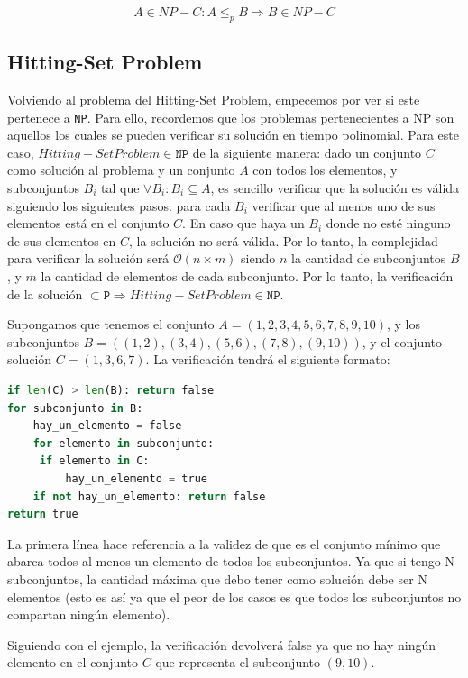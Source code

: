 \[ A \in {NP-C}: A \leq _p B \Rightarrow B \in NP-C \]

\subsection{Hitting-Set Problem}

Volviendo al problema del Hitting-Set Problem, empecemos por ver si este pertenece a \texttt{NP}. Para ello, recordemos que los problemas pertenecientes a NP son aquellos los cuales se pueden verificar su solución en tiempo polinomial. Para este caso, $Hitting-Set Problem \in \texttt{NP}$ de la siguiente manera: dado un conjunto $C$ como solución al problema y un conjunto $A$ con todos los elementos, y subconjuntos $B_i$ tal que $\forall B_i: B_i \subseteq A$, es sencillo verificar que la solución es válida siguiendo los siguientes pasos: para cada $B_i$ verificar que al menos uno de sus elementos está en el conjunto $C$. En caso que haya un $B_i$ donde no esté ninguno de sus elementos en $C$, la solución no será válida. Por lo tanto, la complejidad para verificar la solución será $\mathcal{O}(n \times m)$ siendo $n$ la cantidad de subconjuntos $B$, y $m$ la cantidad de elementos de cada subconjunto. Por lo tanto, la verificación de la solución $\subset \texttt{P} \Rightarrow Hitting-Set Problem \in \texttt{NP}$.

Supongamos que tenemos el conjunto $A = (1, 2, 3, 4, 5, 6, 7, 8, 9, 10)$, y los subconjuntos $B = ((1, 2), (3, 4), (5, 6), (7, 8), (9, 10))$, y el conjunto solución $C = (1, 3, 6, 7)$. La verificación tendrá el siguiente formato:

\begin{lstlisting}[language=Python]
if len(C) > len(B): return false
for subconjunto in B:
    hay_un_elemento = false
    for elemento in subconjunto:
   	 if elemento in C:
   		 hay_un_elemento = true
    if not hay_un_elemento: return false
return true
\end{lstlisting}

La primera línea hace referencia a la validez de que es el conjunto mínimo que abarca todos al menos un elemento de todos los subconjuntos. Ya que si tengo N subconjuntos, la cantidad máxima que debo tener como solución debe ser N elementos (esto es así ya que el peor de los casos es que todos los subconjuntos no compartan ningún elemento).

Siguiendo con el ejemplo, la verificación devolverá false ya que no hay ningún elemento en el conjunto $C$ que representa el subconjunto $(9, 10)$.

